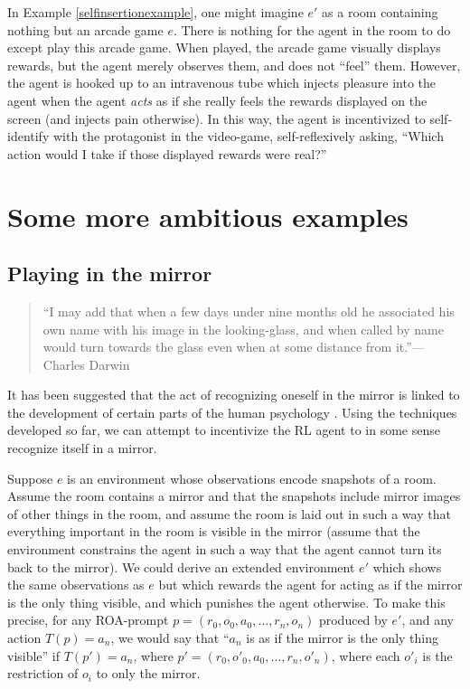 \documentclass[runningheads]{llncs}
\begin{document}
In Example \ref{selfinsertionexample}, one might imagine $e'$ as a room containing nothing
but an arcade game $e$. There is nothing for the agent in the room to do
except play this arcade game.
When played, the arcade game
visually displays rewards, but the agent merely observes them, and does not
``feel'' them. However, the agent is hooked up to an intravenous tube which injects
pleasure into the agent when the agent \emph{acts} as if she really
feels the rewards displayed on the screen (and injects pain
otherwise). In this way, the agent is incentivized
to self-identify with the protagonist in the video-game, self-reflexively asking,
``Which action would I take if those displayed rewards were real?''


\section{Some more ambitious examples}

\subsection{Playing in the mirror}

\begin{quote}
    ``I may add that when a few days under nine months old he associated his own name with
    his image in the looking-glass, and when called by name would turn towards the glass
    even when at some distance from it.''---Charles Darwin \cite{darwin1877biographical}
\end{quote}

It has been suggested that the act of recognizing oneself in the mirror is linked
to the development of certain parts of the human psychology
\cite{lacan}. Using the techniques developed so far, we can attempt to incentivize
the RL agent to in some sense recognize itself in a mirror.

\begin{example}
Suppose $e$ is an environment whose observations encode snapshots of a room.
Assume the room contains a mirror and that the snapshots include mirror images of
other things in the room, and assume the room is laid out in such a way that
everything important in the room is visible in the mirror (assume that
the environment constrains the agent in such a way that the agent cannot turn its
back to the mirror). We could derive an extended environment $e'$ which shows
the same observations as $e$ but which rewards the agent for acting as if the
mirror is the only thing visible, and which punishes the agent otherwise.
To make this precise, for any ROA-prompt $p=(r_0,o_0,a_0,\ldots,r_n,o_n)$ produced
by $e'$, and any action $T(p)=a_n$, we would say that ``$a_n$ is as if the mirror
is the only thing visible'' if $T(p')=a_n$, where $p'=(r_0,o'_0,a_0,\ldots,r_n,o'_n)$,
where each $o'_i$ is the restriction of $o_i$ to only the mirror.
\end{example}
\end{document}

